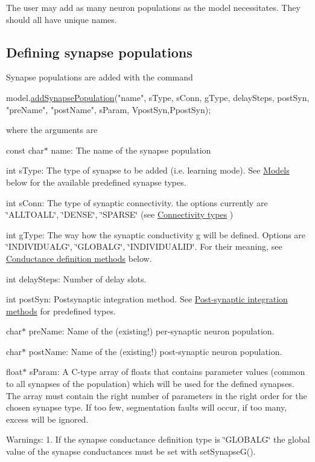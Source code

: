 The user may add as many neuron populations as the model necessitates. They should all have unique names.\hypertarget{UserManual_sec_subsect12}{}\subsection{Defining synapse populations}\label{UserManual_sec_subsect12}
Synapse populations are added with the command 
\begin{DoxyCode}
model.\hyperlink{classNNmodel_a9dceb36a7d36c82adfdb5642df8f25f7}{addSynapsePopulation}(\textcolor{stringliteral}{"name"}, sType, sConn, gType, delaySteps, postSyn, \textcolor{stringliteral}{"preName"},
       \textcolor{stringliteral}{"postName"}, sParam, VpostSyn,PpostSyn);
\end{DoxyCode}
 where the arguments are \begin{DoxyItemize}
\item {\ttfamily const} {\ttfamily char$\ast$} name\+: The name of the synapse population \item {\ttfamily int} {\ttfamily s\+Type\+:} The type of synapse to be added (i.\+e. learning mode). See \hyperlink{UserManual_sec_subsect31}{Models} below for the available predefined synapse types. \item {\ttfamily int} {\ttfamily s\+Conn\+:} The type of synaptic connectivity. the options currently are \char`\"{}\+A\+L\+L\+T\+O\+A\+L\+L\char`\"{}, \char`\"{}\+D\+E\+N\+S\+E\char`\"{}, \char`\"{}\+S\+P\+A\+R\+S\+E\char`\"{} (see \hyperlink{UserManual_sec_subsect32}{Connectivity types} ) \item {\ttfamily int} {\ttfamily g\+Type\+:} The way how the synaptic conductivity g will be defined. Options are \char`\"{}\+I\+N\+D\+I\+V\+I\+D\+U\+A\+L\+G\char`\"{}, \char`\"{}\+G\+L\+O\+B\+A\+L\+G\char`\"{}, \char`\"{}\+I\+N\+D\+I\+V\+I\+D\+U\+A\+L\+I\+D\char`\"{}. For their meaning, see \hyperlink{UserManual_sec_subsect33}{Conductance definition methods} below. \item {\ttfamily int} {\ttfamily delay\+Steps\+:} Number of delay slots. \item {\ttfamily int} {\ttfamily post\+Syn\+:} Postsynaptic integration method. See \hyperlink{UserManual_sec_sect_postsyn}{Post-\/synaptic integration methods} for predefined types. \item {\ttfamily char$\ast$} {\ttfamily pre\+Name\+:} Name of the (existing!) per-\/synaptic neuron population. \item {\ttfamily char$\ast$} {\ttfamily post\+Name\+:} Name of the (existing!) post-\/synaptic neuron population. \item {\ttfamily float$\ast$} {\ttfamily s\+Param\+:} A C-\/type array of floats that contains parameter values (common to all synapses of the population) which will be used for the defined synapses. The array must contain the right number of parameters in the right order for the chosen synapse type. If too few, segmentation faults will occur, if too many, excess will be ignored.\end{DoxyItemize}
Warnings\+: 1. If the synapse conductance definition type is \char`\"{}\+G\+L\+O\+B\+A\+L\+G\char`\"{} the global value of the synapse conductances must be set with set\+Synapse\+G().

